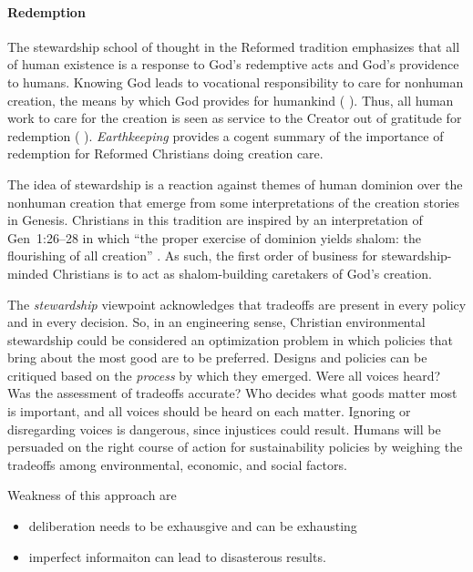 \documentclass[12pt]{article}
\begin{document}
\paragraph{Redemption} 
\label{sec:redemption}

The stewardship school of thought in the Reformed tradition
emphasizes that all of human existence
is a response to God's redemptive acts
and God's providence to humans.
Knowing God leads to vocational responsibility 
to care for nonhuman creation,
the means by which God provides for humankind  %
(\textcite{Jenkins:2008} \textcite[19]{Jenkins:2008}). 
Thus, all human work to care for the creation 
is seen as service to the Creator
out of gratitude for redemption (\textcite{Jenkins:2008} \textcite[77]{Jenkins:2008}).
\emph{Earthkeeping} \autocite{Wilkenson:1980aa} provides a cogent summary
of the importance of redemption for Reformed Christians doing creation care.

The idea of stewardship is a reaction against themes of human dominion over the nonhuman creation
that emerge from some interpretations of the creation stories in Genesis.
Christians in this tradition are inspired by an interpretation of Gen~1:26–28 in which 
``the proper exercise of dominion yields shalom: the flourishing of all creation'' \autocite{BoumaPrediger:2019}.
As such, the first order of business for stewardship-minded Christians
is to act as shalom-building caretakers of God's creation.

The \emph{stewardship} viewpoint acknowledges that tradeoffs
are present in every policy and in every decision. 
So, in an engineering sense, 
Christian environmental stewardship could be considered an optimization problem
in which policies that bring about the most good 
are to be preferred.
Designs and policies can be critiqued based on the \emph{process} by which they emerged.
Were all voices heard? Was the assessment of tradeoffs accurate?
Who decides what goods matter most is important, and 
all voices should be heard on each matter.
Ignoring or disregarding voices is dangerous,
since injustices could result.
Humans will be persuaded on the right course of action
for sustainability policies by weighing the tradeoffs 
among environmental, economic, and social factors.

Weakness of this approach are
%
\begin{itemize}

  \item deliberation needs to be exhausgive and can be exhausting

  \item imperfect informaiton can lead to disasterous results.

\end{itemize}
\end{document}
